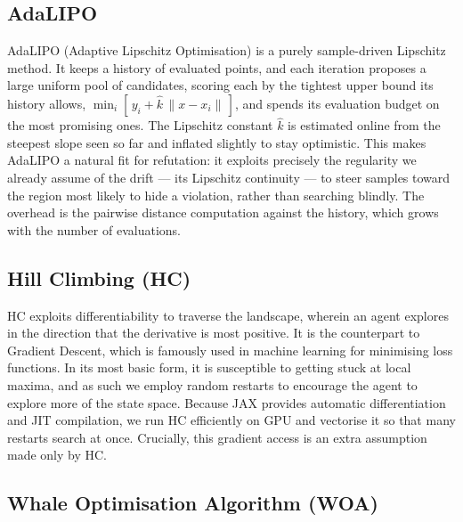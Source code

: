 \subsection{AdaLIPO}

AdaLIPO (Adaptive Lipschitz Optimisation) \cite{malherbe2017global} is a purely sample-driven Lipschitz
method. It keeps a history of evaluated points, and each iteration proposes a
large uniform pool of candidates, scoring each by the tightest upper bound its
history allows, $\min_i [\, y_i + \hat{k}\,\lVert x - x_i\rVert \,]$, and spends
its evaluation budget on the most promising ones. The Lipschitz constant
$\hat{k}$ is estimated online from the steepest slope seen so far and inflated
slightly to stay optimistic. This makes AdaLIPO a natural fit for refutation: it
exploits precisely the regularity we already assume of the drift --- its
Lipschitz continuity --- to steer samples toward the region most likely to hide
a violation, rather than searching blindly. The overhead is the pairwise
distance computation against the history, which grows with the number of
evaluations.

\subsection{Hill Climbing (HC)}

HC exploits differentiability to traverse the landscape, wherein an agent explores in the direction that the derivative is most positive. It is the counterpart to Gradient Descent, which is famously used in machine learning for minimising loss functions. In its most basic form, it is susceptible to getting stuck at local maxima, and as such we employ random restarts to encourage the agent to explore more of the state space. Because JAX provides automatic differentiation and JIT compilation, we run HC efficiently on GPU and vectorise it so that many restarts search at once. Crucially, this gradient access is an extra assumption made only by HC.

\subsection{Whale Optimisation Algorithm (WOA)}

